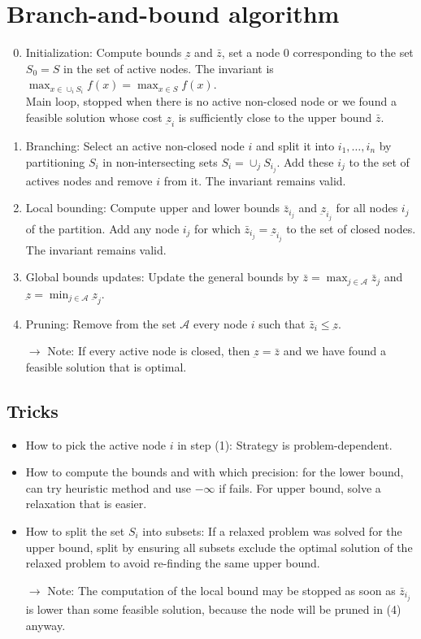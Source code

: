 \documentclass[11pt, openany]{report}
\theoremstyle{definition}
\begin{document}
\section{Branch-and-bound algorithm}
\begin{enumerate}\setcounter{enumi}{-1}
    \item Initialization: Compute bounds $\underbar z$ and $\bar z$, set a node 0 corresponding to the set $S_0=S$ in the set of active nodes. The invariant is $\max_{x\in \cup_i S_i} f(x) = \max_{x\in S}f(x)$. \\
    
    Main loop, stopped when there is no active non-closed node or we found a feasible solution whose cost $\underbar z_i$ is sufficiently close to the upper bound $\bar z$. 
    \item Branching: Select an active non-closed node $i$ and split it into $i_1,\dots,i_n$ by partitioning $S_i$ in non-intersecting sets $S_i = \cup_{j} S_{i_j}$. Add these $i_j$ to the set of actives nodes and remove $i$ from it. The invariant remains valid.
    \item Local bounding: Compute upper and lower bounds $\bar z_{i_j}$ and $\underbar z_{i_j}$ for all nodes $i_j$ of the partition. Add any node $i_j$ for which $\bar z_{i_j}=\underbar z_{i_j}$ to the set of closed nodes. The invariant remains valid.
    \item Global bounds updates: Update the general bounds by $\bar z = \max_{j\in \mathcal{A}} \bar z_j$ and $\underbar z = \min_{j\in \mathcal{A}} \underbar z_j$.
    \item Pruning: Remove from the set $\mathcal{A}$ every node $i$ such that $\bar z_i\le \underbar z$. 
\end{enumerate}
\begin{itemize}
    \item [$\rightarrow$] Note: If every active node is closed, then $\underbar{z} = \bar z$ and we have found a feasible solution that is optimal. 
\end{itemize}
\subsection{Tricks}
\begin{itemize}
    \item How to pick the active node $i$ in step (1): Strategy is problem-dependent.
    \item How to compute the bounds and with which precision: for the lower bound, can try heuristic method and use $-\infty$ if fails. For upper bound, solve a relaxation that is easier.
    \item How to split the set $S_i$ into subsets: If a relaxed problem was solved for the upper bound, split by ensuring all subsets exclude the optimal solution of the relaxed problem to avoid re-finding the same upper bound. 
    \item [$\rightarrow$] Note: The computation of the local bound may be stopped as soon as $\bar z_{i_j}$ is lower than some feasible solution, because the node will be pruned in (4) anyway. 
\end{itemize}
\end{document}
